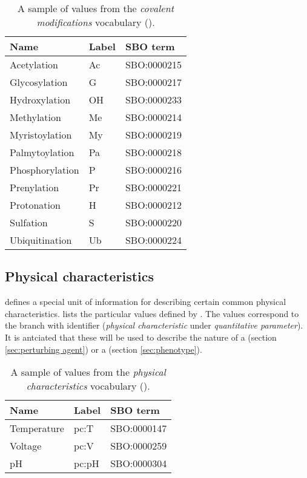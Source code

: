 \begin{table}[h]
  \centering
  \begin{tabular}{l>{\ttfamily}l>{\ttfamily}l}
    \toprule
    \textbf{Name}   & \textbf{\rmfamily Label} & \textbf{\rmfamily SBO term} \\
    \midrule
    Acetylation     & Ac    & SBO:0000215\\
    Glycosylation   & G     & SBO:0000217\\
    Hydroxylation   & OH    & SBO:0000233\\
    Methylation     & Me    & SBO:0000214\\
    Myristoylation  & My    & SBO:0000219\\
    Palmytoylation  & Pa    & SBO:0000218\\
    Phosphorylation & P     & SBO:0000216\\
    Prenylation     & Pr    & SBO:0000221\\
    Protonation     & H     & SBO:0000212\\
    Sulfation       & S     & SBO:0000220\\
    Ubiquitination  & Ub    & SBO:0000224\\
    \bottomrule
  \end{tabular}
  \caption{A sample of values from the \emph{covalent modifications} vocabulary
    ().}
  \label{tab:covalent-mod-cv}
\end{table}


\subsection{Physical characteristics}
\label{sec:physical-characteristics-cv}

\SBGNPDLone defines a special unit of information for describing certain common physical characteristics.   lists the particular values defined by \SBGNPDLone.  The values correspond to the \sbo branch with identifier  (\emph{physical characteristic} under \emph{quantitative parameter}). It is antciated that these will be used to describe the nature of a  (section \ref{sec:perturbing agent}) or a  (section \ref{sec:phenotype}).

\begin{table}[h]
  \centering
  \begin{tabular}{l>{\ttfamily}l>{\ttfamily}l}
    \toprule
    \textbf{Name}   & \textbf{\rmfamily Label} & \textbf{\rmfamily SBO term} \\
    \midrule
    Temperature   & pc:T  & SBO:0000147\\
    Voltage       & pc:V  & SBO:0000259\\
    pH            & pc:pH & SBO:0000304\\
    \bottomrule
  \end{tabular}
  \caption{A sample of values from the \emph{physical
      characteristics} vocabulary ().}
  \label{tab:physical-characteristics-cv}
\end{table}


